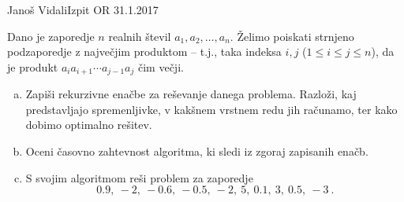 \begin{naloga}{Janoš Vidali}{Izpit OR 31.1.2017}
\begin{vprasanje}
Dano je zaporedje $n$ realnih števil $a_1, a_2, \dots, a_n$.
Želimo poiskati strnjeno podzaporedje z največjim produktom
-- t.j., taka indeksa $i, j$ ($1 \le i \le j \le n$),
da je produkt $a_i a_{i+1} \cdots a_{j-1} a_j$ čim večji.

\begin{enumerate}[(a)]
\item Zapiši rekurzivne enačbe za reševanje danega problema.
Razloži, kaj pred\-stav\-lja\-jo spremenljivke,
v kakšnem vrstnem redu jih računamo,
ter kako dobimo optimalno rešitev.

\item Oceni časovno zahtevnost algoritma, ki sledi iz zgoraj zapisanih enačb.

\item S svojim algoritmom reši problem za zaporedje
$$
0.9, \ -2, \ -0.6, \ -0.5, \ -2, \ 5, \ 0.1, \ 3, \ 0.5, \ -3 \ .
$$
\end{enumerate}
\end{vprasanje}
\begin{odgovor}
\end{odgovor}
\end{naloga}
